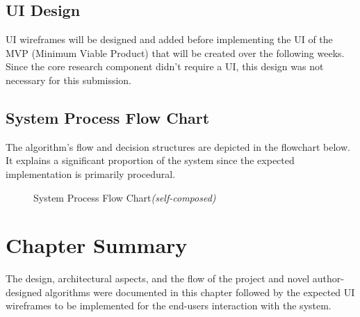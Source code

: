 \subsection{UI Design}
UI wireframes will be designed and added before implementing the UI of the MVP (Minimum Viable Product) that will be created over the following weeks. Since the core research component didn't require a UI, this design was not necessary for this submission.

\subsection{System Process Flow Chart}
The algorithm's flow and decision structures are depicted in the flowchart below. It explains a significant proportion of the system since the expected implementation is primarily procedural.

\begin{figure}[h!]
\centering
\setlength{\fboxsep}{10pt}%
\setlength{\fboxrule}{0.5pt}%
\caption{System Process Flow Chart\textit{(self-composed)}}
\label{fig:system-process-flowchart}
\end{figure}



\section{Chapter Summary}
The design, architectural aspects, and the flow of the project and novel author-designed algorithms were documented in this chapter followed by the expected UI wireframes to be implemented for the end-users interaction with the system.
